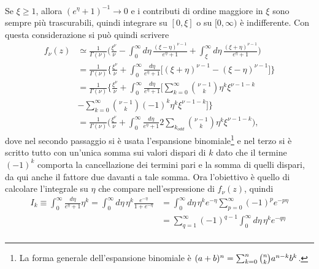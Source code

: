 \begin{caso}
\begin{equation}
\begin{split}
        \end{split} 
    \end{equation}
    Se $\xi \ge 1$, allora $(e^\eta + 1)^{-1} \to 0$ e i contributi di ordine maggiore in $\xi$ sono sempre più trascurabili, quindi integrare su $[0,\xi]$ o su $[0,\infty)$ è indifferente. Con questa considerazione si può quindi scrivere
    \begin{equation}
        \begin{split}
            f_\nu(z) &\simeq \frac{1}{\Gamma(\nu)} \bigg( \frac{\xi^{\nu}}{\nu} - \int_{0}^{\infty}d\eta\, \frac{(\xi - \eta)^{\nu-1}}{e^\eta+1} + \int_{\xi}^{\infty}d\eta\,  \frac{(\xi + \eta)^{\nu-1}}{e^{\eta}+1}\bigg) \\
            &= \frac{1}{\Gamma(\nu)} \bigg\{ \frac{\xi^{\nu}}{\nu} + \int_{0}^{\infty}\frac{d\eta}{e^\eta+1}\bigg[ (\xi + \eta)^{\nu-1} - (\xi - \eta)^{\nu-1} \bigg]\bigg\} \\
            &= \frac{1}{\Gamma(\nu)} \bigg\{ \frac{\xi^{\nu}}{\nu} + \int_{0}^{\infty}\frac{d\eta}{e^\eta+1}\bigg[\sum_{k=0}^\infty\binom{\nu - 1}{k}\eta^k\xi^{\nu - 1 -k} \\
            &- \sum_{k=0}^\infty\binom{\nu-1}{k}(-1)^k\eta^k\xi^{\nu - 1 - k} \bigg]\bigg\} \\
            &= \frac{1}{\Gamma(\nu)} \bigg(\frac{\xi^\nu}{\nu} + \int_0^\infty\frac{d\eta}{e^\eta  + 1}2\sum_{k_{odd}}\binom{\nu - 1}{k}\eta^k\xi^{\nu - 1 -k}\bigg),
        \end{split}
    \end{equation}
    dove nel secondo passaggio si è usata l'espansione binomiale\footnote{La forma generale dell'espansione binomiale è $(a + b)^n = \sum\nolimits_{k=0}^n\binom{n}{k}a^{n-k}b^k$.} e nel terzo  si è scritto tutto con un'unica somma sui valori dispari di $k$ dato che il termine $(-1)^k$ comporta la cancellazione dei termini pari e la somma di quelli dispari, da qui anche il fattore due davanti a tale somma. Ora l'obiettivo è quello di calcolare l'integrale su $\eta$ che compare nell'espressione di $f_\nu(z)$, quindi
    \begin{equation}
        \begin{split}
            I_k \equiv \int_0^\infty\frac{d\eta}{e^\eta  + 1}\eta^k = \int_0^\infty d\eta\,\eta^k\frac{e^{-\eta}}{1 + e^{-\eta}} &= \int_0^\infty d\eta\,\eta^ke^{-\eta}\sum_{p=0}^\infty (-1)^pe^{-p\eta} \\
            &= \sum_{q=1}^\infty (-1)^{q-1}\int_0^\infty d\eta\,\eta^ke^{-q\eta} \\

\end{split}
\end{equation}
\end{caso}
